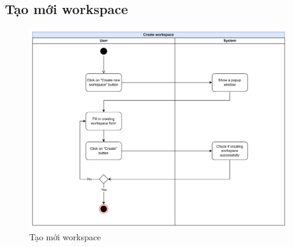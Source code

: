 \subsection{Tạo mới workspace}
    \begin{figure}[H]
        \centering
        \includegraphics[width=\linewidth]{Content/Phân tích và thiết kế hệ thống/documents/Sơ đồ hoạt động/images/createWorkspace.png}
        \vspace{0.5cm}
        \caption{Tạo mới workspace}
        \label{fig:Tạo mới workspace}
    \end{figure}